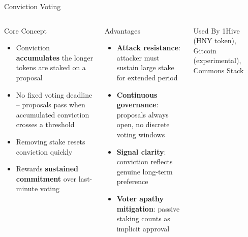 \documentclass[8pt,aspectratio=169]{beamer}
\begin{document}
\begin{frame}{Conviction Voting}
\begin{columns}[T]
\begin{block}{Core Concept}
\footnotesize
\begin{itemize}
  \item Conviction \textbf{accumulates} the longer tokens are staked on a proposal
  \item No fixed voting deadline -- proposals pass when accumulated conviction crosses a threshold
  \item Removing stake resets conviction quickly
  \item Rewards \textbf{sustained commitment} over last-minute voting
\end{itemize}
\end{block}
\vspace{2mm}
\begin{block}{Advantages}
\footnotesize
\begin{itemize}
  \item \textbf{Attack resistance}: attacker must sustain large stake for extended period
  \item \textbf{Continuous governance}: proposals always open, no discrete voting windows
  \item \textbf{Signal clarity}: conviction reflects genuine long-term preference
  \item \textbf{Voter apathy mitigation}: passive staking counts as implicit approval
\end{itemize}
\end{block}
\vspace{2mm}
\begin{exampleblock}{Used By}
\footnotesize
1Hive (HNY token), Gitcoin (experimental), Commons Stack
\end{exampleblock}


\end{columns}
\end{frame}
\end{document}
